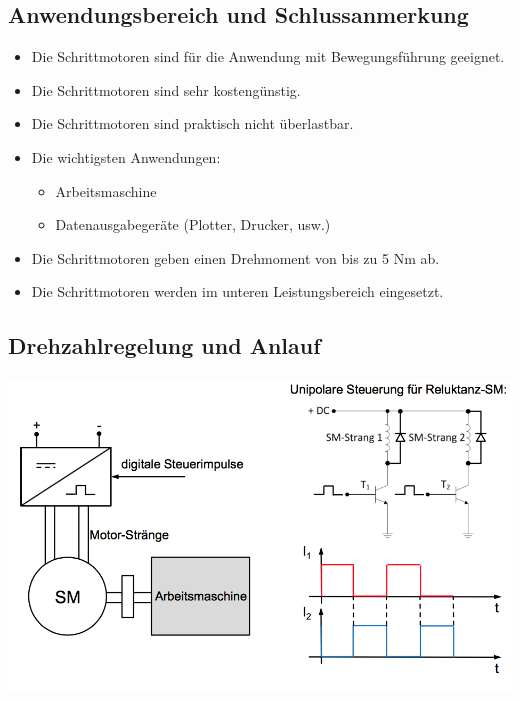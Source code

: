 \begin{minipage}{0.5 \linewidth}
\subsection{Anwendungsbereich und Schlussanmerkung}
\begin{itemize}
\item Die Schrittmotoren sind für die Anwendung mit Bewegungsführung geeignet.
\item Die Schrittmotoren sind sehr kostengünstig.
\item Die Schrittmotoren sind praktisch nicht überlastbar.
\item Die wichtigsten Anwendungen:
\begin{itemize}
\item Arbeitsmaschine
\item Datenausgabegeräte (Plotter, Drucker, usw.)
\end{itemize}
\item Die Schrittmotoren geben einen Drehmoment von bis zu 5 Nm ab.
\item Die Schrittmotoren werden im unteren Leistungsbereich eingesetzt. 
\end{itemize}
\end{minipage}
\begin{minipage}{0.5 \linewidth}
\subsection{Drehzahlregelung und Anlauf}
\includegraphics[width = \linewidth]{./Pics/VL67/Drehzahl}
\end{minipage}
